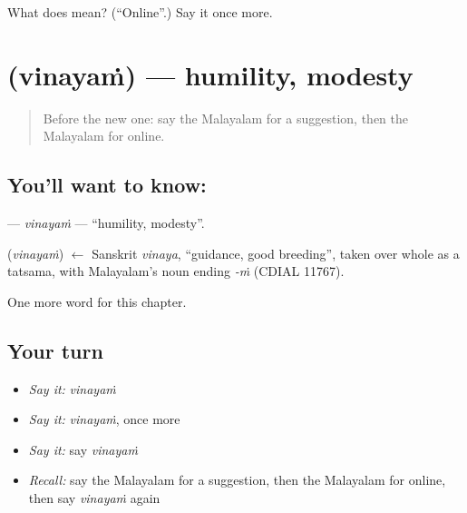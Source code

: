 \begin{tcolorbox}[breakable,colback=teal!4,colframe=teal!35!black,title={Before you move on}]
What does  mean? (\textquotedblleft{}Online\textquotedblright{}.) Say it once more.
\end{tcolorbox}
\section[\texorpdfstring{\ml{വിനയം} (vinayaṁ)}{വിനയം (vinayaṁ)}]{ (vinayaṁ) — humility, modesty}

\label{lesson:ML-C319-vinayam}



\begin{quote}
Before the new one: say the Malayalam for a suggestion, then the Malayalam for online.
\end{quote}

\subsection*{You'll want to know: }
\textbf{} — \emph{vinayaṁ} — \textquotedblleft{}humility, modesty\textquotedblright{}.

\begin{cousinweb}
\textbf{} (\emph{vinayaṁ}) $\leftarrow$ Sanskrit \emph{vinaya}, \textquotedblleft{}guidance, good breeding\textquotedblright{}, taken over whole as a tatsama, with Malayalam's noun ending \emph{-ṁ} (CDIAL 11767).
\end{cousinweb}

\begin{grammarlens}[title={What you've built}]
One more word for this chapter.
\end{grammarlens}

\subsection*{Your turn}
\begin{itemize}
\raggedright
  \item \emph{Say it:} \emph{vinayaṁ}
  \item \emph{Say it:} \emph{vinayaṁ}, once more
  \item \emph{Say it:} say \emph{vinayaṁ}
  \item \emph{Recall:} say the Malayalam for a suggestion, then the Malayalam for online, then say \emph{vinayaṁ} again
\end{itemize}

